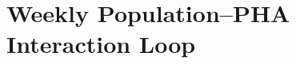 \documentclass[sigconf,review]{acmart}
\begin{document}
\section{Weekly Population–PHA Interaction Loop}
\label{supp:weekly-loop}




\end{document}
